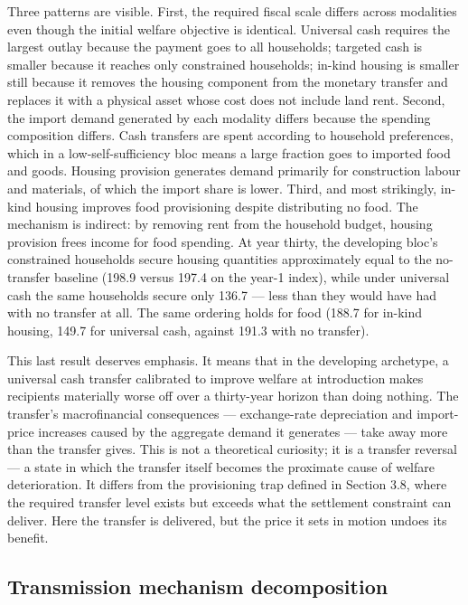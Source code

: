 \documentclass[preprint,review,12pt]{elsarticle}
\begin{document}
Three patterns are visible. First, the required fiscal scale differs
across modalities even though the initial welfare objective is
identical. Universal cash requires the largest outlay because the
payment goes to all households; targeted cash is smaller because it
reaches only constrained households; in-kind housing is smaller still
because it removes the housing component from the monetary transfer and
replaces it with a physical asset whose cost does not include land rent.
Second, the import demand generated by each modality differs because the
spending composition differs. Cash transfers are spent according to
household preferences, which in a low-self-sufficiency bloc means a
large fraction goes to imported food and goods. Housing provision
generates demand primarily for construction labour and materials, of
which the import share is lower. Third, and most strikingly, in-kind
housing improves food provisioning despite distributing no food. The
mechanism is indirect: by removing rent from the household budget,
housing provision frees income for food spending. At year thirty, the
developing bloc's constrained households secure housing quantities
approximately equal to the no-transfer baseline (198.9 versus 197.4 on
the year-1 index), while under universal cash the same households secure
only 136.7 --- less than they would have had with no transfer at all. The
same ordering holds for food (188.7 for in-kind housing, 149.7 for
universal cash, against 191.3 with no transfer).

This last result deserves emphasis. It means that in the developing
archetype, a universal cash transfer calibrated to improve welfare at
introduction makes recipients materially worse off over a thirty-year
horizon than doing nothing. The transfer's macrofinancial consequences
--- exchange-rate depreciation and import-price increases caused by the
aggregate demand it generates --- take away more than the transfer
gives. This is not a theoretical curiosity; it is a transfer reversal
--- a state in which the transfer itself becomes the proximate cause of
welfare deterioration. It differs from the provisioning trap defined in
Section 3.8, where the required transfer level exists but exceeds what
the settlement constraint can deliver. Here the transfer is delivered,
but the price it sets in motion undoes its benefit.

\subsection{Transmission mechanism decomposition}
\end{document}
